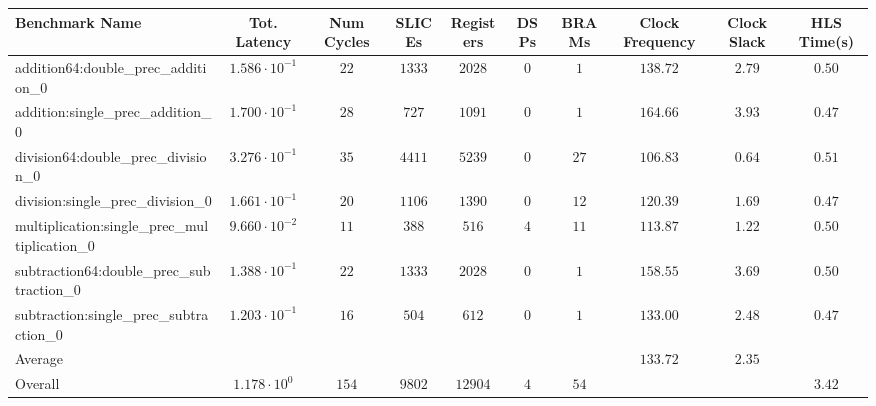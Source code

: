 \begin{tabular}{|l|c|c|c|c|c|c|c|c|c|}
\hline
Benchmark Name                                 & Tot. Latency            & Num Cycles & SLICEs   & Registers & DSPs  & BRAMs  & Clock Frequency & Clock Slack & HLS Time(s) \\
\hline
addition64:double\_prec\_addition\_0           & $ 1.586 \cdot 10^{-1} $ & $ 22     $ & $ 1333 $ & $ 2028  $ & $ 0 $ & $ 1  $ & $ 138.72      $ & $ 2.79    $ & $ 0.50    $ \\
addition:single\_prec\_addition\_0             & $ 1.700 \cdot 10^{-1} $ & $ 28     $ & $ 727  $ & $ 1091  $ & $ 0 $ & $ 1  $ & $ 164.66      $ & $ 3.93    $ & $ 0.47    $ \\
division64:double\_prec\_division\_0           & $ 3.276 \cdot 10^{-1} $ & $ 35     $ & $ 4411 $ & $ 5239  $ & $ 0 $ & $ 27 $ & $ 106.83      $ & $ 0.64    $ & $ 0.51    $ \\
division:single\_prec\_division\_0             & $ 1.661 \cdot 10^{-1} $ & $ 20     $ & $ 1106 $ & $ 1390  $ & $ 0 $ & $ 12 $ & $ 120.39      $ & $ 1.69    $ & $ 0.47    $ \\
multiplication:single\_prec\_multiplication\_0 & $ 9.660 \cdot 10^{-2} $ & $ 11     $ & $ 388  $ & $ 516   $ & $ 4 $ & $ 11 $ & $ 113.87      $ & $ 1.22    $ & $ 0.50    $ \\
subtraction64:double\_prec\_subtraction\_0     & $ 1.388 \cdot 10^{-1} $ & $ 22     $ & $ 1333 $ & $ 2028  $ & $ 0 $ & $ 1  $ & $ 158.55      $ & $ 3.69    $ & $ 0.50    $ \\
subtraction:single\_prec\_subtraction\_0       & $ 1.203 \cdot 10^{-1} $ & $ 16     $ & $ 504  $ & $ 612   $ & $ 0 $ & $ 1  $ & $ 133.00      $ & $ 2.48    $ & $ 0.47    $ \\
\hline
Average                                        & $                     $ & $        $ & $      $ & $       $ & $   $ & $    $ & $ 133.72      $ & $ 2.35    $ & $         $ \\
\hline
Overall                                        & $ 1.178 \cdot 10^{0}  $ & $ 154    $ & $ 9802 $ & $ 12904 $ & $ 4 $ & $ 54 $ & $             $ & $         $ & $ 3.42    $ \\
\hline
\end{tabular}
